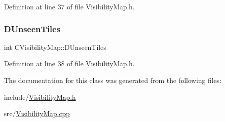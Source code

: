 Definition at line 37 of file Visibility\+Map.\+h.

\hypertarget{classCVisibilityMap_a117ff39fef73ffd4cc4ba35c35e63171}{}\label{classCVisibilityMap_a117ff39fef73ffd4cc4ba35c35e63171} 
\subsubsection{\texorpdfstring{D\+Unseen\+Tiles}{DUnseenTiles}}
{\footnotesize\ttfamily int C\+Visibility\+Map\+::\+D\+Unseen\+Tiles\hspace{0.3cm}{\ttfamily [protected]}}



Definition at line 38 of file Visibility\+Map.\+h.



The documentation for this class was generated from the following files\+:\begin{DoxyCompactItemize}
\item 
include/\hyperlink{VisibilityMap_8h}{Visibility\+Map.\+h}\item 
src/\hyperlink{VisibilityMap_8cpp}{Visibility\+Map.\+cpp}\end{DoxyCompactItemize}
